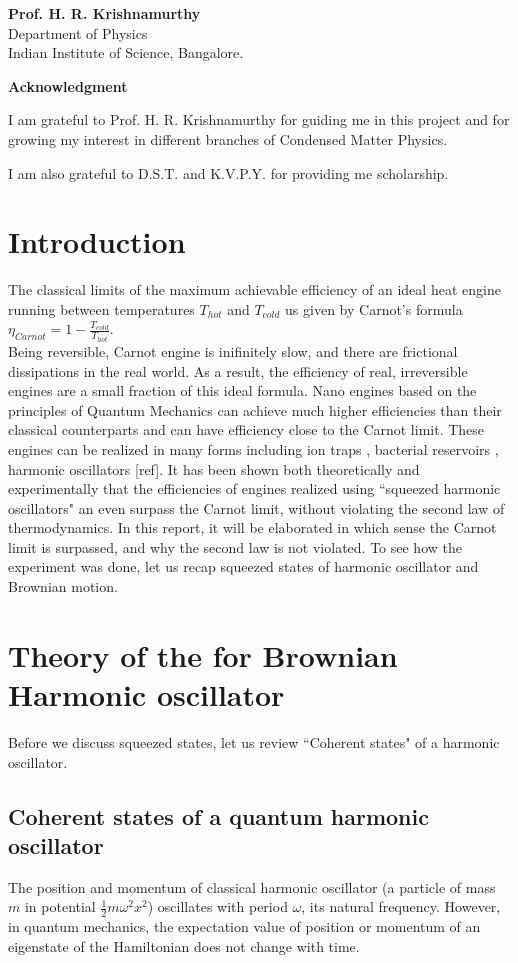 \documentclass[12pt, twoside]{article}
\begin{document}
\textbf{Prof. H. R. Krishnamurthy}\\
Department of Physics\\
Indian Institute of Science, Bangalore.
\newpage
\begin{center}
	\textbf{Acknowledgment}
\end{center}

I am grateful to Prof. H. R. Krishnamurthy for guiding me in this project and for growing my interest in different branches of Condensed Matter Physics.

I am also grateful to D.S.T. and K.V.P.Y. for providing me scholarship.
\tableofcontents

\section{Introduction}
The classical limits of the maximum achievable efficiency of an ideal heat engine running between temperatures $T_{hot}$ and $T_{cold}$ us given by Carnot's formula $\eta_{Carnot} = 1 - \frac{T_{cold}}{T_{hot}}$.\\
Being reversible, Carnot engine is inifinitely slow, and there are frictional dissipations in the real world. As a result, the efficiency of real, irreversible engines are a small fraction of this ideal formula.
Nano engines based on the principles of Quantum Mechanics can achieve much higher efficiencies than their classical counterparts \cite{Millen_2016} and can have efficiency close to the Carnot limit.
These engines can be realized in many forms including ion traps \cite{ion_trap_abah}, bacterial reservoirs \cite{bacterial_reservoir}, harmonic oscillators [ref].
It has been shown both theoretically \cite{abah_et_al} and experimentally \cite{klaers} that the efficiencies of engines realized using ``squeezed harmonic oscillators" an even surpass the Carnot limit, without violating the second law of thermodynamics. In this report, it will be elaborated in which sense the Carnot limit is surpassed, and why the second law is not violated.
To see how the experiment \cite{klaers} was done, let us recap squeezed states of harmonic oscillator and Brownian motion.
\section{Theory of the for Brownian Harmonic oscillator}

Before we discuss squeezed states, let us review ``Coherent states" of a harmonic oscillator.
\subsection{Coherent states of a quantum harmonic oscillator}
The position and momentum of classical harmonic oscillator (a particle of mass $m$ in potential $\frac{1}{2}m\omega^2x^2$)  oscillates with period $\omega$, its natural frequency.
However, in quantum mechanics, the expectation value of position or momentum of an eigenstate of the Hamiltonian does not change with time.
\end{document}
